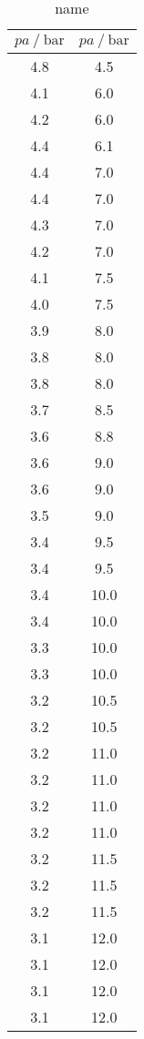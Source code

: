 \begin{table}[H] 
   \centering 
   \caption{name} 
   \label{tab:name} 
   \begin{tabular} { c c } 
 \toprule 
 {$pa\:/\: \mathrm{bar}$} & {$pa\:/\: \mathrm{bar}$} \\ 
    \midrule 
    4.8 & 4.5 \\ 
    4.1 & 6.0 \\ 
    4.2 & 6.0 \\ 
    4.4 & 6.1 \\ 
    4.4 & 7.0 \\ 
    4.4 & 7.0 \\ 
    4.3 & 7.0 \\ 
    4.2 & 7.0 \\ 
    4.1 & 7.5 \\ 
    4.0 & 7.5 \\ 
    3.9 & 8.0 \\ 
    3.8 & 8.0 \\ 
    3.8 & 8.0 \\ 
    3.7 & 8.5 \\ 
    3.6 & 8.8 \\ 
    3.6 & 9.0 \\ 
    3.6 & 9.0 \\ 
    3.5 & 9.0 \\ 
    3.4 & 9.5 \\ 
    3.4 & 9.5 \\ 
    3.4 & 10.0 \\ 
    3.4 & 10.0 \\ 
    3.3 & 10.0 \\ 
    3.3 & 10.0 \\ 
    3.2 & 10.5 \\ 
    3.2 & 10.5 \\ 
    3.2 & 11.0 \\ 
    3.2 & 11.0 \\ 
    3.2 & 11.0 \\ 
    3.2 & 11.0 \\ 
    3.2 & 11.5 \\ 
    3.2 & 11.5 \\ 
    3.2 & 11.5 \\ 
    3.1 & 12.0 \\ 
    3.1 & 12.0 \\ 
    3.1 & 12.0 \\ 
    3.1 & 12.0 \\ 
    \bottomrule 
  \end{tabular}
\end{table}
